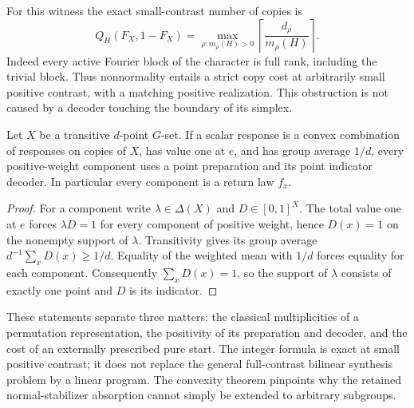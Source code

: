 For this witness the exact small-contrast number of copies is
\begin{equation}\label{eq:r75-character-copies}
 Q_H(F_X,1-F_X)
 =\max_{\rho:m_\rho(H)>0}
   \left\lceil\frac{d_\rho}{m_\rho(H)}\right\rceil.
\end{equation}
Indeed every active Fourier block of the character is full rank,
including the trivial block. Thus nonnormality entails a strict copy
cost at arbitrarily small positive contrast, with a matching positive
realization. This obstruction is not caused by a decoder touching the
boundary of its simplex.

\begin{lemma}
\label{lem:r75-return-rigidity}
Let $X$ be a transitive $d$-point $G$-set. If a scalar response is a
convex combination of responses on copies of $X$, has value one at
$e$, and has group average $1/d$, every positive-weight component
uses a point preparation and its point indicator decoder. In
particular every component is a return law $f_x$.
\end{lemma}
\begin{proof}
For a component write $\lambda\in\Delta(X)$ and $D\in[0,1]^X$.
The total value one at $e$ forces $\lambda D=1$ for every component
of positive weight, hence $D(x)=1$ on the nonempty support of
$\lambda$. Transitivity gives its group average
$d^{-1}\sum_xD(x)\ge1/d$. Equality of the weighted mean with $1/d$
forces equality for each component. Consequently $\sum_xD(x)=1$,
so the support of $\lambda$ consists of exactly one point and $D$
is its indicator.
\end{proof}

These statements separate three matters: the classical multiplicities
of a permutation representation, the positivity of its preparation
and decoder, and the cost of an externally prescribed pure start.
The integer formula is exact at small positive contrast; it does not
replace the general full-contrast bilinear synthesis problem by a
linear program. The convexity theorem pinpoints why the retained
normal-stabilizer absorption cannot simply be extended to arbitrary
subgroups.
